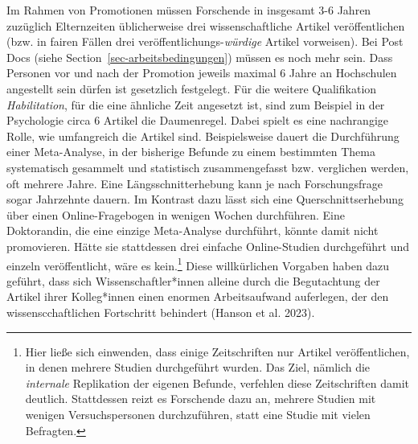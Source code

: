 \documentclass[
  letterpaper,
  DIV=11,
  numbers=noendperiod]{scrreprt}
\begin{document}
Im Rahmen von Promotionen müssen Forschende in insgesamt 3-6 Jahren
zuzüglich Elternzeiten üblicherweise drei wissenschaftliche Artikel
veröffentlichen (bzw. in fairen Fällen drei
veröffentlichungs-\emph{würdige} Artikel vorweisen). Bei Post Docs
(siehe Section~\ref{sec-arbeitsbedingungen}) müssen es noch mehr sein.
Dass Personen vor und nach der Promotion jeweils maximal 6 Jahre an
Hochschulen angestellt sein dürfen ist gesetzlich festgelegt. Für die
weitere Qualifikation \emph{Habilitation}, für die eine ähnliche Zeit
angesetzt ist, sind zum Beispiel in der Psychologie circa 6 Artikel die
Daumenregel. Dabei spielt es eine nachrangige Rolle, wie umfangreich die
Artikel sind. Beispielsweise dauert die Durchführung einer Meta-Analyse,
in der bisherige Befunde zu einem bestimmten Thema systematisch
gesammelt und statistisch zusammengefasst bzw. verglichen werden, oft
mehrere Jahre. Eine Längsschnitterhebung kann je nach Forschungsfrage
sogar Jahrzehnte dauern. Im Kontrast dazu lässt sich eine
Querschnittserhebung über einen Online-Fragebogen in wenigen Wochen
durchführen. Eine Doktorandin, die eine einzige Meta-Analyse durchführt,
könnte damit nicht promovieren. Hätte sie stattdessen drei einfache
Online-Studien durchgeführt und einzeln veröffentlicht, wäre es
kein.\footnote{Hier ließe sich einwenden, dass einige Zeitschriften nur
  Artikel veröffentlichen, in denen mehrere Studien durchgeführt wurden.
  Das Ziel, nämlich die \emph{internale} Replikation der eigenen
  Befunde, verfehlen diese Zeitschriften damit deutlich. Stattdessen
  reizt es Forschende dazu an, mehrere Studien mit wenigen
  Versuchspersonen durchzuführen, statt eine Studie mit vielen
  Befragten.} Diese willkürlichen Vorgaben haben dazu geführt, dass sich
Wissenschaftler*innen alleine durch die Begutachtung der Artikel ihrer
Kolleg*innen einen enormen Arbeitsaufwand auferlegen, der den
wissenscchaftlichen Fortschritt behindert (Hanson et al. 2023).
\end{document}
